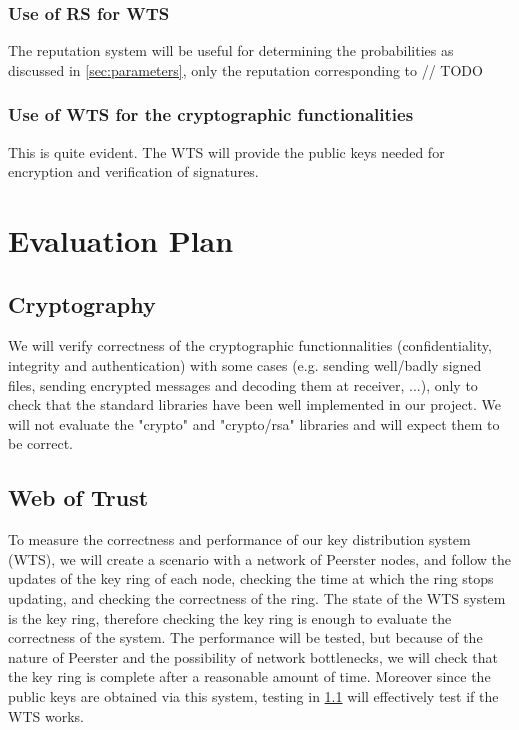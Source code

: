\documentclass[]{article}
\begin{document}
        \subsubsection{Use of RS for WTS}
        The reputation system will be useful for determining the probabilities as discussed in \ref{sec:parameters}, only the reputation corresponding to // TODO
        
        \subsubsection{Use of WTS for the cryptographic functionalities}
        This is quite evident. The WTS will provide the public keys needed for encryption and verification of signatures.
        
    \section{Evaluation Plan}
        
        \subsection{Cryptography}
        \label{sec:crypt-test}
        We will verify correctness of the cryptographic functionnalities (confidentiality, integrity and authentication) with some cases (e.g. sending well/badly signed files, sending encrypted messages and decoding them at receiver, ...), only to check that the standard libraries have been well implemented in our project. We will not evaluate the "crypto" and "crypto/rsa" libraries and will expect them to be correct.
        
        \subsection{Web of Trust}
        To measure the correctness and performance of our key distribution system (WTS), we will create a scenario with a network of Peerster nodes, and follow the updates of the key ring of each node, checking the time at which the ring stops updating, and checking the correctness of the ring. The state of the WTS system is the key ring, therefore checking the key ring is enough to evaluate the correctness of the system. The performance will be tested, but because of the nature of Peerster and the possibility of network bottlenecks, we will check that the key ring is complete after a reasonable amount of time. Moreover since the public keys are obtained via this system, testing in \ref{sec:crypt-test} will effectively test if the WTS works.
    
    {}
    
    
\end{document}
